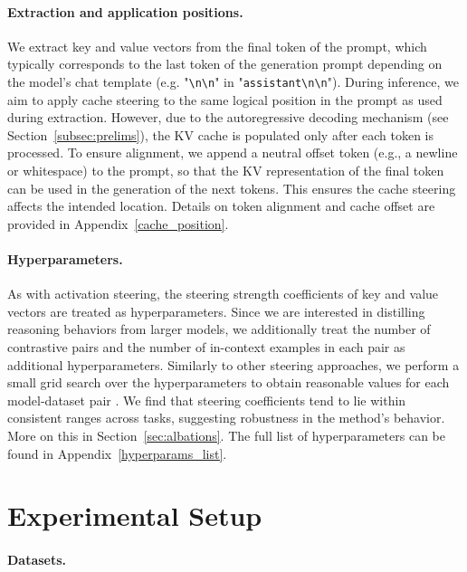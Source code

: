\documentclass{article} %
\begin{document}
\paragraph{Extraction and application positions.}

We extract key and value vectors from the final token of the prompt, which typically corresponds to the last token of the generation prompt depending on the model's chat template (e.g. "\verb!\n!\verb!\n!" in "\texttt{assistant}\verb!\n!\verb!\n!").
During inference, we aim to apply cache steering to the same logical position in the prompt as used during extraction. However, due to the autoregressive decoding mechanism (see Section~\ref{subsec:prelims}), the KV cache is populated only after each token is processed. To ensure alignment, we append a neutral offset token (e.g., a newline or whitespace) to the prompt, so that the KV representation of the final token can be used in the generation of the next tokens. This ensures the cache steering affects the intended location. Details on token alignment and cache offset are provided in Appendix~\ref{cache_position}.

\paragraph{Hyperparameters.}

As with activation steering, the steering strength coefficients of key and value vectors are treated as hyperparameters. Since we are interested in distilling reasoning behaviors from larger models, we additionally treat the number of contrastive pairs and the number of in-context examples in each pair as additional hyperparameters. Similarly to other steering approaches, we perform a small grid search over the hyperparameters to obtain reasonable values for each model-dataset pair \citep{turner2308activation, lee2024programming, wang2025adaptive, dong2024contrans, panickssery2023steering, wang2024semantics, stolfo2024improving, zhanguncovering, postmus2024steering}. We find that steering coefficients tend to lie within consistent ranges across tasks, suggesting robustness in the method's behavior. More on this in Section~\ref{sec:albations}. The full list of hyperparameters can be found in Appendix~\ref{hyperparams_list}.

\section{Experimental Setup} \label{sec:experimental_setup}
\paragraph{Datasets.}
\end{document}
